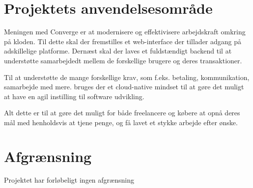 \section{Projektets anvendelsesområde}

Meningen med Converge er at modernisere og effektivisere arbejdskraft omkring på kloden. Til dette skal der fremstilles et web-interface der tillader adgang på adskillelige platforme. Dernæst skal der laves et fuldstændigt backend til at understøtte samarbejdedt mellem de forskellige brugere og deres transaktioner.

Til at understøtte de mange forskellige krav, som f.eks. betaling, kommunikation, samarbejde med mere. bruges der et cloud-native mindset til at gøre det muligt at have en agil instilling til software udvikling.

Alt dette er til at gøre det muligt for både freelancere og købere at opnå deres mål med henholdsvis at tjene penge, og få lavet et stykke arbejde efter ønske.

\section{Afgrænsning}

Projektet har forløbeligt ingen afgrænsning

